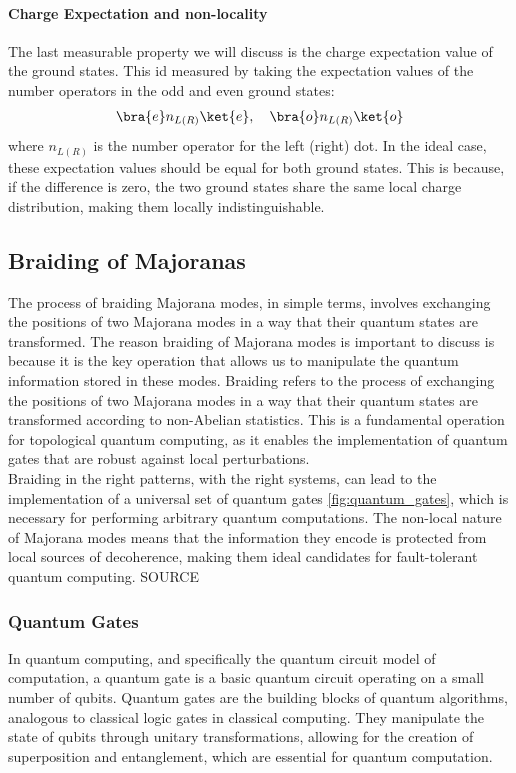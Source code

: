 \paragraph{Charge Expectation and non-locality}
The last measurable property we will discuss is the charge expectation value of the ground states. This id measured by taking the expectation values of the number operators in the odd and even ground states:
$$
\bra{e}n_{L(R)} \ket{e}, \quad \bra{o}n_{L(R)} \ket{o}
$$
where $n_{L(R)}$ is the number operator for the left (right) dot. In the ideal case, these expectation values should be equal for both ground states. This is because, if the difference is zero, the two ground states share the same local charge distribution, making them locally indistinguishable. 

\subsection{Braiding of Majoranas}
The process of braiding Majorana modes, in simple terms, involves exchanging the positions of two Majorana modes in a way that their quantum states are transformed.
The reason braiding of Majorana modes is important to discuss is because it is the key operation that allows us to manipulate the quantum information stored in these modes. Braiding refers to the process of exchanging the positions of two Majorana modes in a way that their quantum states are transformed according to non-Abelian statistics. This is a fundamental operation for topological quantum computing, as it enables the implementation of quantum gates that are robust against local perturbations.\\
Braiding in the right patterns, with the right systems, can lead to the implementation of a universal set of quantum gates \ref{fig:quantum_gates}, which is necessary for performing arbitrary quantum computations. The non-local nature of Majorana modes means that the information they encode is protected from local sources of decoherence, making them ideal candidates for fault-tolerant quantum computing.{\color{red} SOURCE}\\ 
\subsubsection{Quantum Gates}
In quantum computing, and specifically the quantum circuit model of computation, a quantum gate is a basic quantum circuit operating on a small number of qubits. Quantum gates are the building blocks of quantum algorithms, analogous to classical logic gates in classical computing. They manipulate the state of qubits through unitary transformations, allowing for the creation of superposition and entanglement, which are essential for quantum computation.\\

